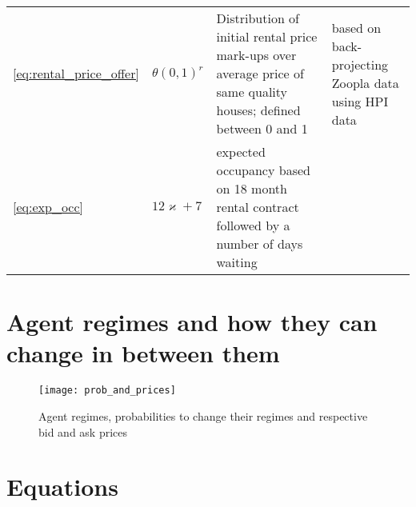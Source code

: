 \documentclass[]{article}
\begin{document}
\begin{longtable}{p{1cm} p{4cm} p{5cm} p{3cm}}
	\eqref{eq:rental_price_offer}&  $\theta(0,1)^{r} $& Distribution of initial rental price mark-ups over average price of same quality houses; defined between 0 and 1& based on back-projecting Zoopla data using HPI data\\

	\eqref{eq:exp_occ}& $12\varkappa + 7 $ & expected occupancy based on 18 month rental contract followed by a number of days waiting&\\	
	
	

\end{longtable} 


%	
%	
%	
%	
\section{Agent regimes and how they can change in between them}

\begin{figure}[h!]
	\centering
	\texttt{[image: prob\_and\_prices]}
	\caption{Agent regimes, probabilities to change their regimes and respective bid and ask prices}
	\label{fig:probandprices}
\end{figure}

\FloatBarrier
\section{Equations}
\end{document}
